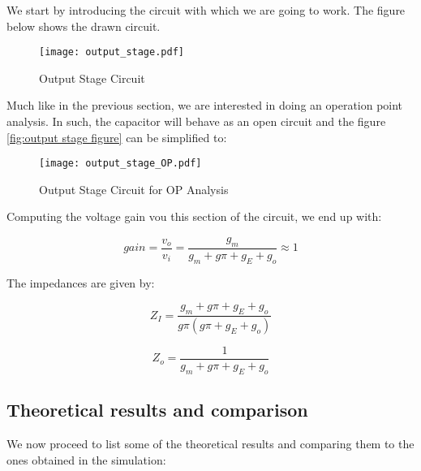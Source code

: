 We start by introducing the circuit with which we are going to work. The figure below shows the drawn circuit.

\begin{figure}[h!]
\centering
\texttt{[image: output\_stage.pdf]}
\caption{Output Stage Circuit}
\label{fig:output_stage_figure}
\end{figure}

Much like in the previous section, we are interested in doing an operation point analysis. In such, the capacitor will behave as an open circuit and the figure \ref{fig:output stage figure} can be simplified to:

\begin{figure}[h!]
\centering
\texttt{[image: output\_stage\_OP.pdf]}
\caption{Output Stage Circuit for OP Analysis}
\label{fig:output_stage_figure_OP}
\end{figure}


Computing the voltage gain vou this section of the circuit, we end up with:

\begin{equation}
gain=\frac{v_o}{v_i}=\frac{g_m}{g_m+g{\pi}+g_E+g_o} \approx 1
\end{equation}

The impedances are given by:

\begin{equation}
Z_I=\frac{g_m+g{\pi}+g_E+g_o}{g{\pi}(g{\pi}+g_E+g_o)}
\end{equation}


\begin{equation}
Z_o=\frac{1}{g_m+g{\pi}+g_E+g_o}
\end{equation}

\subsection {Theoretical results and comparison}

We now proceed to list some of the theoretical results and comparing them to the ones obtained in the simulation:

